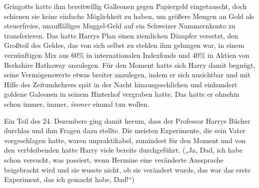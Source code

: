 Gringotts hatte ihm bereitwillig Galleonen gegen Papiergeld eingetauscht, doch schienen sie keine einfache Möglichkeit zu haben, um größere Mengen an Gold als steuerfreies, unauffälliges Muggel-Geld auf ein Schweizer Nummernkonto zu transferieren. Das hatte Harrys Plan einen ziemlichen Dämpfer versetzt, den Großteil des Geldes, das von sich selbst zu stehlen ihm gelungen war, in einem vernünftigen Mix aus 60\% in internationalen Indexfonds und 40\% in Aktien von Berkshire Hathaway anzulegen.%
Für den Moment hatte sich Harry damit begnügt, seine Vermögenswerte etwas breiter anzulegen, indem er sich unsichtbar und mit Hilfe des Zeitumkehrers spät in der Nacht hinausgeschlichen und einhundert goldene Galeonen in seinem Hinterhof vergraben hatte. Das hatte er ohnehin schon immer, immer, \emph{immer} einmal tun wollen.

Ein Teil des 24. Dezembers ging damit herum, dass der Professor Harrys Bücher durchlas und ihm Fragen dazu stellte. Die meisten Experimente, die sein Vater vorgeschlagen hatte, waren unpraktikabel, zumindest für den Moment und von den verbleibenden hatte Harry viele bereits durchgeführt. („Ja, Dad, ich habe schon versucht, was passiert, wenn Hermine eine veränderte Aussprache beigebracht wird und sie wusste nicht, ob sie verändert wurde, das war das erste Experiment, das ich gemacht habe, Dad!“)

